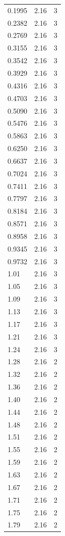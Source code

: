 \begin{longtable}{lrr}
  0.1995 & 2.16 & 3 \\
  0.2382 & 2.16 & 3 \\
  0.2769 & 2.16 & 3 \\
  0.3155 & 2.16 & 3 \\
  0.3542 & 2.16 & 3 \\
  0.3929 & 2.16 & 3 \\
  0.4316 & 2.16 & 3 \\
  0.4703 & 2.16 & 3 \\
  0.5090 & 2.16 & 3 \\
  0.5476 & 2.16 & 3 \\
  0.5863 & 2.16 & 3 \\
  0.6250 & 2.16 & 3 \\
  0.6637 & 2.16 & 3 \\
  0.7024 & 2.16 & 3 \\
  0.7411 & 2.16 & 3 \\
  0.7797 & 2.16 & 3 \\
  0.8184 & 2.16 & 3 \\
  0.8571 & 2.16 & 3 \\
  0.8958 & 2.16 & 3 \\
  0.9345 & 2.16 & 3 \\
  0.9732 & 2.16 & 3 \\
  1.01 & 2.16 & 3 \\
  1.05 & 2.16 & 3 \\
  1.09 & 2.16 & 3 \\
  1.13 & 2.16 & 3 \\
  1.17 & 2.16 & 3 \\
  1.21 & 2.16 & 3 \\
  1.24 & 2.16 & 3 \\
  1.28 & 2.16 & 2 \\
  1.32 & 2.16 & 2 \\
  1.36 & 2.16 & 2 \\
  1.40 & 2.16 & 2 \\
  1.44 & 2.16 & 2 \\
  1.48 & 2.16 & 2 \\
  1.51 & 2.16 & 2 \\
  1.55 & 2.16 & 2 \\
  1.59 & 2.16 & 2 \\
  1.63 & 2.16 & 2 \\
  1.67 & 2.16 & 2 \\
  1.71 & 2.16 & 2 \\
  1.75 & 2.16 & 2 \\
  1.79 & 2.16 & 2 \\

\end{longtable}
